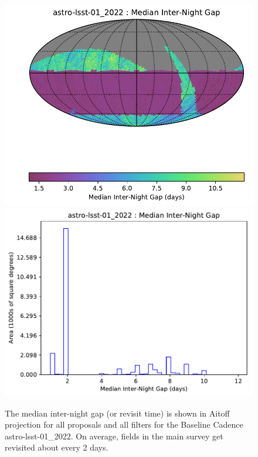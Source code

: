 \documentclass[DM,lsstdraft,authoryear,toc]{lsstdoc}
\begin{document}
\begin{figure}[t!]
\vskip -0.0in
\includegraphics[angle=0,width=0.49\hsize,clip]{figures/astro-lsst-01_2022_Median_Inter-Night_Gap_HEAL_SkyMap.pdf}
\includegraphics[angle=0,width=0.49\hsize,clip]{figures/astro-lsst-01_2022_Median_Inter-Night_Gap_HEAL_Histogram.pdf}
\vskip -0.1in
\caption{The median inter-night gap (or revisit time) is shown in Aitoff projection
for all proposals and all filters for the Baseline Cadence astro-lsst-01\_2022.
On average, fields in the main survey get revisited about every 2 days.}
\label{fig:baseline_GapAll}
\end{figure}
\end{document}

